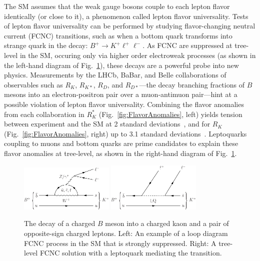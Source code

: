 
The SM assumes that the weak gauge bosons couple to each lepton flavor identically (or close to it), a phenomenon called lepton flavor universality. Tests of lepton flavor universality can be performed by studying flavor-changing neutral current (FCNC) transitions, such as when a bottom quark transforms into strange quark in the decay: $B^+\rightarrow K^+\ell^+\ell^-$. As FCNC are suppressed at tree-level in the SM, occuring only via higher order electroweak processes (as shown in the left-hand diagram of Fig.~\ref{fig:FCNC}), these decays are a powerful probe into new physics. Measurements by the LHCb, BaBar, and Belle collaborations of observables such as $R_K$, $R_{K*}$, $R_D$, and $R_{D*}$---the decay branching fractions of $B$ mesons into an electron-positron pair over a muon-antimuon pair---hint at a possible violation of lepton flavor universality. Combining the flavor anomalies from each collaboration in $R_K^*$ (Fig.~\ref{fig:FlavorAnomalies}, left) yields tension between experiment and the SM at 2 standard deviations~\cite{LHCb1}, and for $R_K$ (Fig.~\ref{fig:FlavorAnomalies}, right) up to 3.1 standard deviations~\cite{LHCb2}. Leptoquarks coupling to muons and bottom quarks are prime candidates to explain these flavor anomalies at tree-level, as shown in the right-hand diagram of Fig.~\ref{fig:FCNC}.

\begin{figure}[H]
    \centering
    \includegraphics[width=0.4\textwidth]{Images/BplusDecayFCNC.pdf}\hspace{0.1\textwidth}
    \includegraphics[width=0.4\textwidth]{Images/BplusDecayLQ.pdf}
    \caption{The decay of a charged $B$ meson into a charged kaon and a pair of opposite-sign charged leptons. Left: An example of a loop diagram FCNC process in the SM that is strongly suppressed. Right: A tree-level FCNC solution with a leptoquark mediating the transition.}
    \label{fig:FCNC}
\end{figure}

